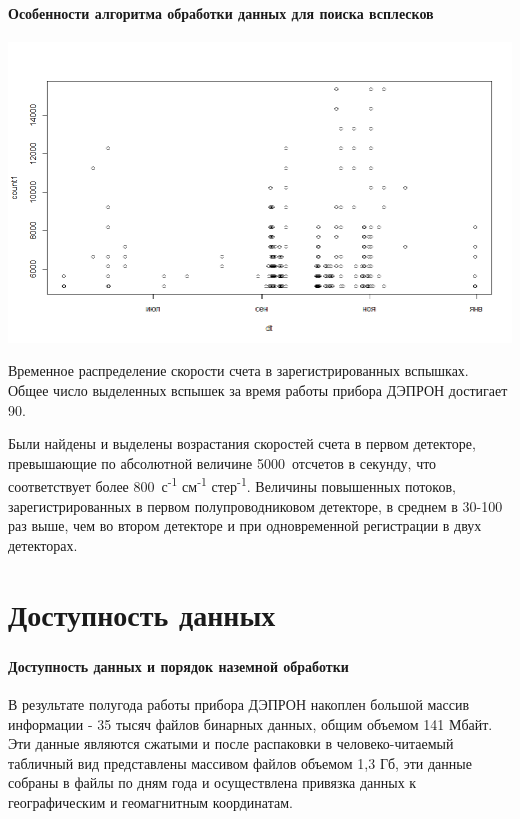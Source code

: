 \documentclass[t, aspectratio=43]{beamer}
\begin{document}
\begin{frame}	
	\frametitle{\insertsection} 
	\framesubtitle{Особенности алгоритма обработки данных для поиска всплесков}
	\centering
	
	\includegraphics[width=0.7\linewidth]{images/Flash/Rplot03.png}
	
{\tiny 	Временное распределение скорости счета в зарегистрированных вспышках. Общее число выделенных вспышек за время работы прибора ДЭПРОН достигает 90.
	
	
	 \begin{flushleft}
	 	Были найдены и выделены возрастания скоростей счета в первом детекторе, превышающие по абсолютной величине 5000~отсчетов в секунду, что соответствует более 800~с\textsuperscript{-1} см\textsuperscript{-1} стер\textsuperscript{-1}.  
		Величины повышенных потоков, зарегистрированных в первом полупроводниковом детекторе, в среднем в 30-100 раз выше, чем во втором детекторе и при одновременной регистрации в двух детекторах.
 \end{flushleft}
}
\end{frame}


\section{Доступность данных}

\begin{frame}	
\frametitle{\insertsection} 
\framesubtitle{Доступность данных и порядок наземной обработки}
В результате полугода работы прибора ДЭПРОН накоплен большой массив информации - 35 тысяч файлов бинарных данных, общим объемом 141 Мбайт. Эти данные являются сжатыми и после распаковки в человеко-читаемый табличный вид представлены массивом файлов объемом 1,3 Гб, эти данные собраны в файлы по дням года и осуществлена привязка данных к географическим и геомагнитным координатам.
\end{frame}
\end{document}
